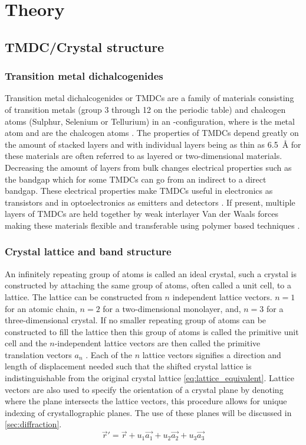\section{Theory}
\subsection{TMDC/Crystal structure}
\subsubsection{Transition metal dichalcogenides}
Transition metal dichalcogenides or TMDCs are a family of materials consisting of transition metals (group 3 through 12 on the periodic table) and chalcogen atoms (Sulphur, Selenium or Tellurium) in an -configuration, where  is the metal atom and  are the chalcogen atoms \cite{C7TA04268J}.
The properties of TMDCs depend greatly on the amount of stacked layers and with individual layers being as thin as \SI{6.5}{\angstrom} for  these materials are often referred to as layered or two-dimensional materials.
Decreasing the amount of layers from bulk changes electrical properties such as the bandgap which for some TMDCs can go from an indirect to a direct bandgap.
These electrical properties make TMDCs useful in electronics as transistors and in optoelectronics as emitters and detectors \cite{emerg_photolum, LopezSanchez2013, Radisavljevic2011}. 
If present, multiple layers of TMDCs are held together by weak interlayer Van der Waals forces making these materials flexible and transferable using polymer based techniques \cite{reganEmergingExcitonPhysics2022a}.

\subsubsection{Crystal lattice and band structure}
An infinitely repeating group of atoms is called an ideal crystal, such a crystal is constructed by attaching the same group of atoms, often called a unit cell, to a lattice.
The lattice can be constructed from $n$ independent lattice vectors. $n=1$ for an atomic chain, $n=2$ for a two-dimensional monolayer, and, $n=3$ for a three-dimensional crystal.
If no smaller repeating group of atoms can be constructed to fill the lattice then this group of atoms is called the primitive unit cell and the $n$-independent lattice vectors are then called the primitive translation vectors $a_{n}$ \cite{Kittel1995-qt}.
Each of the $n$ lattice vectors signifies a direction and length of displacement needed such that the shifted crystal lattice is indistinguishable from the original crystal lattice \ref{eq:lattice_equivalent}.
Lattice vectors are also used to specify the orientation of a crystal plane by denoting where the plane intersects the lattice vectors, this procedure allows for unique indexing of crystallographic planes. The use of these planes will be discussed in \ref{sec:diffraction}.
\begin{equation}
    \vec{r}' = \vec{r} + u_1 \vec{a_1} +u_2 \vec{a_2} + u_3 \vec{a_3}
    \label{eq:lattice_equivalent}
\end{equation}

